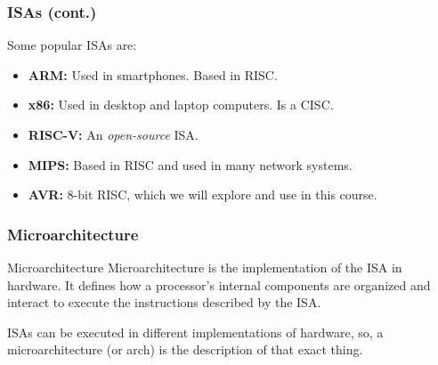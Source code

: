 \documentclass[aspectratio=169]{beamer}
\begin{document}
\begin{frame}
  \frametitle{ISAs (cont.)}
  Some popular ISAs are: \pause
  \begin{itemize}
    \item <2-> \textbf{ARM:} Used in smartphones. Based in RISC.
    \item <3-> \textbf{x86:} Used in desktop and laptop computers. Is a CISC.
    \item <4-> \textbf{RISC-V:} An \textit{open-source} ISA.
    \item <5-> \textbf{MIPS:} Based in RISC and used in many network systems.
    \item <6-> \textbf{AVR:} 8-bit RISC, which we will explore and use in this course.
  \end{itemize}
\end{frame}

\begin{frame}
  \frametitle{Microarchitecture}
  \begin{block}{Microarchitecture}
    Microarchitecture is the implementation of the ISA in hardware. It defines how a processor's internal components are organized and interact to execute the instructions described by the ISA.   
  \end{block}
  ISAs can be executed in different implementations of hardware, so, a microarchitecture (or \textmu arch) is the description of that exact thing. 
\end{frame}

  
\end{document}
